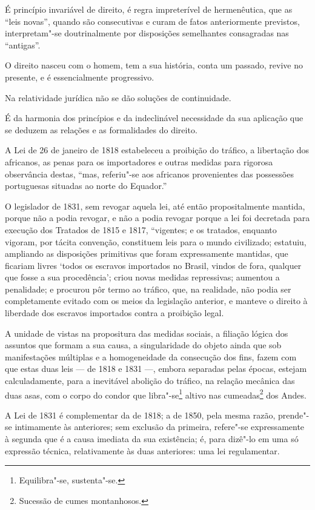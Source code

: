 É princípio invariável de direito, é regra impreterível de hermenêutica,
que as ``leis novas'', quando são consecutivas e curam de fatos
anteriormente previstos, interpretam"-se doutrinalmente por disposições
semelhantes consagradas nas ``antigas''.

O direito nasceu com o homem, tem a sua história, conta um passado,
revive no presente, e é essencialmente progressivo.

Na relatividade jurídica não se dão soluções de continuidade.

É da harmonia dos princípios e da indeclinável necessidade da sua
aplicação que se deduzem as relações e as formalidades do direito.

A Lei de 26 de janeiro de 1818 estabeleceu a proibição do tráfico, a
libertação dos africanos, as penas para os importadores e outras medidas
para rigorosa observância destas, ``mas, referiu"-se aos africanos
provenientes das possessões portuguesas situadas ao norte do Equador.''

O legislador de 1831, sem revogar aquela lei, até então propositalmente
mantida, porque não a podia revogar, e não a podia revogar porque a lei
foi decretada para execução dos Tratados de 1815 e 1817, ``vigentes; e os
tratados, enquanto vigoram, por tácita convenção, constituem leis para o
mundo civilizado; estatuiu, ampliando as disposições primitivas que
foram expressamente mantidas, que ficariam livres `todos os escravos
importados no Brasil, vindos de fora, qualquer que fosse a sua
procedência'; criou novas medidas repressivas; aumentou a penalidade; e
procurou pôr termo ao tráfico, que, na realidade, não podia ser
completamente evitado com os meios da legislação anterior, e manteve o
direito à liberdade dos escravos importados contra a proibição legal.

A unidade de vistas na propositura das medidas sociais, a filiação
lógica dos assuntos que formam a sua causa, a singularidade do objeto
ainda que sob manifestações múltiplas e a homogeneidade da consecução
dos fins, fazem com que estas duas leis --- de 1818 e 1831 ---, embora
separadas pelas épocas, estejam calculadamente, para a inevitável
abolição do tráfico, na relação mecânica das duas asas, com o corpo do
condor que libra"-se\footnote{Equilibra"-se, sustenta"-se.} altivo nas
cumeadas\footnote{Sucessão de cumes montanhosos.} dos Andes.

A Lei de 1831 é complementar da de 1818; a de 1850, pela mesma razão,
prende"-se intimamente às anteriores; sem exclusão da primeira, refere"-se
expressamente à segunda que é a causa imediata da sua existência; é,
para dizê"-lo em uma só expressão técnica, relativamente às duas
anteriores: uma lei regulamentar.

